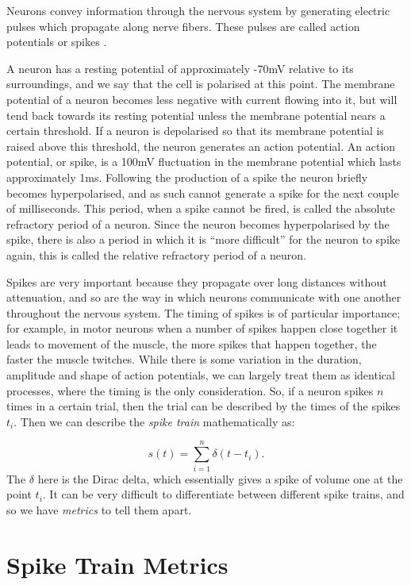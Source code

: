 \documentclass[a4paper,12pt]{report}
\begin{document}
Neurons convey information through the nervous system by generating
electric pulses which propagate along nerve fibers.  These pulses are
called action potentials or spikes \cite{DayanAbbott2001a}. 

A neuron has a resting potential of approximately -70mV relative to
its surroundings, and we say that the cell is polarised at this point.
The membrane potential of a neuron becomes less negative with current
flowing into it, but will tend back towards its resting potential
unless the membrane potential nears a certain threshold. If a neuron
is depolarised so that its membrane potential is raised above this
threshold, the neuron generates an action potential. An action potential, or 
spike, is a 100mV fluctuation in the membrane potential which lasts 
approximately 1ms. Following the production of a spike the neuron briefly 
becomes hyperpolarised, and as such cannot generate a spike for the next
couple of milliseconds.  This period, when a spike cannot be fired, is
called the absolute refractory period of a neuron.  Since the neuron
becomes hyperpolarised by the spike, there is also a period in which
it is ``more difficult'' for the neuron to spike again, this is called
the relative refractory period of a neuron. 

Spikes are very important because they propagate over long distances without 
attenuation, and so are the way in which neurons communicate with one another 
throughout the nervous system.  The timing of spikes is of particular 
importance; for example, in motor neurons when a number of spikes happen close 
together it leads to movement of the muscle, the more spikes that happen 
together, the faster the muscle twitches.  While there is some variation in 
the duration, amplitude and shape of action potentials, we can largely treat 
them as identical processes, where the timing is the only consideration.  So, 
if a neuron spikes $n$ times in a certain trial, then the trial can be 
described by the times of the spikes $t_i$.  Then we can describe the 
{\sl spike train} mathematically as:

\begin{equation}
s(t) = \sum_{i=1}^n \delta(t-t_i).
\end{equation}
The $\delta$ here is the Dirac delta, which essentially gives a spike of volume 
one at the point $t_i$. It can be very difficult to differentiate between 
different spike trains, and so we have {\sl metrics} to tell them apart.

\section{Spike Train Metrics}
\end{document}
